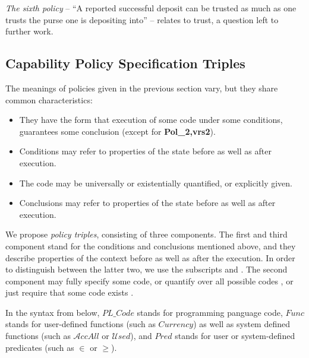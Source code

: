  \vspace{.1in}
\noindent
{\it The sixth policy} -- ``A reported successful deposit can be trusted as much as one trusts the purse one
is depositing into'' -- relates to trust, a question left  to further work.
  
 


\label{HasAccess}


\subsection{Capability Policy Specification Triples}

The meanings of policies given in  the previous section vary, but they share  common characteristics:\begin{itemize}
\item  They have the form that execution of some code under some conditions, guarantees some conclusion (except for {\bf Pol\_2,vrs2}).
\item Conditions may refer to properties of the state before as well as after execution.
\item The code may be universally  or existentially quantified, or  explicitly given.
\item Conclusions may refer to properties of the state before as well as after execution.
\end{itemize}

\newcommand{\old}{{\ensuremath{_{\prg{OLD}}}}}   %
\newcommand{\new}{{\ensuremath{_{\prg{NEW}}}}}   %
\newcommand{\some}{{\prg{SOME}}}
\newcommand{\any}{{\prg{ANY}}}

We propose   {\em policy triples},   consisting of three components. %
  The first and third component %
stand for the conditions and conclusions mentioned above,  and they describe properties of the context before as well as after the execution.
In order to distinguish between the latter two, we use the subscripts   and .
The second component   may fully specify some code, or quantify over all possible codes \any, or just require that some code exists \some.

In the syntax from below, $PL\_Code$ stands for programming panguage code, $Func$ stands for user-defined functions (such as $Currency$) as well as system defined functions (such as ${\mathcal A}ccAll$ or ${\mathcal U}sed$), and $Pred$ stands for user or system-defined predicates (such as $\in$ or $\geq$).

